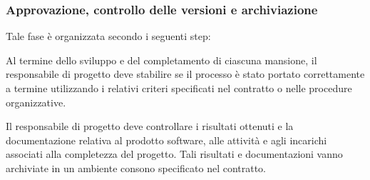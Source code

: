 \subsubsection{Approvazione, controllo delle versioni e archiviazione}
Tale fase è organizzata secondo i seguenti step:

Al termine dello sviluppo e del completamento di ciascuna mansione, il responsabile di progetto deve stabilire se il processo è stato portato correttamente a termine utilizzando i relativi criteri specificati nel contratto o nelle procedure organizzative.

Il responsabile di progetto deve controllare i risultati ottenuti e la documentazione relativa al prodotto software, alle attività e agli incarichi associati alla completezza del progetto. Tali risultati e documentazioni vanno archiviate in un ambiente consono specificato nel contratto.
